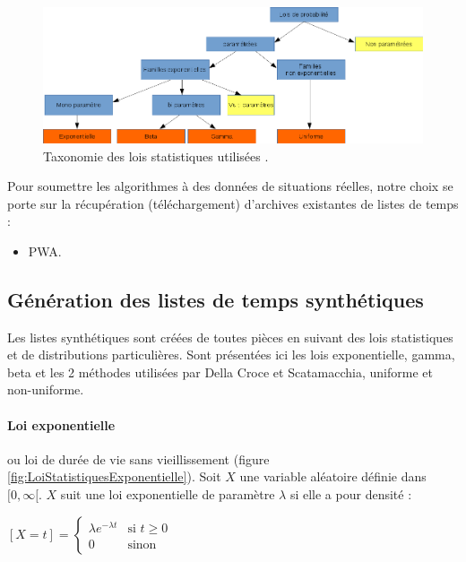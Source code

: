 \documentclass[a4paper,12pt]{report}
\theoremstyle{plain}				%
\theoremstyle{definition}				%
\newcommand\dcs{Della Croce et Scatamacchia\xspace}
\newcommand{\lp}[1]{\todo[author=LP,color=yellow,inline]{#1}}
\begin{document}
\begin{figure}
{\centering
\includegraphics[width=\columnwidth]{taxonomieLoisStatistiques.png}
\caption{Taxonomie des lois statistiques utilisées \cite{nielsen2009statistical}.}
\label{fig:taxonomieLoisStatistiques}
\par}
\end{figure}

Pour soumettre les algorithmes à des données de situations réelles,
notre choix se porte sur la récupération (téléchargement) d'archives
existantes de listes de temps :
\lp{Dire ce que c'est}
\begin{itemize}
	\item PWA.
\end{itemize}


\subsection{Génération des listes de temps synthétiques}\label{ssec:instancesGenerationListesTempsSynthetiques}
Les listes synthétiques sont créées de toutes pièces en suivant des lois statistiques et de distributions particulières. Sont présentées ici les lois exponentielle, gamma, beta et les 2 méthodes utilisées par \dcs, uniforme et non-uniforme.

\bigskip
\paragraph{Loi exponentielle} 
ou loi de durée de vie sans vieillissement (figure \ref{fig:LoiStatistiquesExponentielle}).
Soit $X$ une variable aléatoire définie dans $[0, \infty[$. $X$ suit une loi exponentielle de paramètre $\lambda$ si elle a pour densité :


  \begin{center}
  $[X=t] = \left\{
    \begin{array}{ll}
        \lambda e^{-\lambda t}  & \mbox{si } t \geq 0  \\
        0 & \mbox{sinon}
    \end{array}
	\right.$
  \label{definitionLoiExponentielleDensite}
  \end{center}
\end{document}
